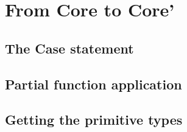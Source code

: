 

\chapter{From Core to Core'}


\section{The Case statement}


\section{Partial function application}


\section{Getting the primitive types}



